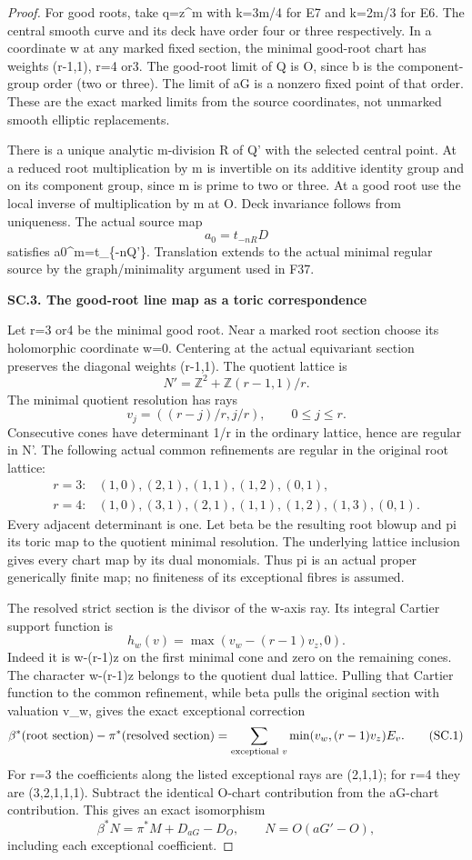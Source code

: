 \begin{proof}
For good roots, take q=z\^{}m with k=3m/4 for E7 and k=2m/3 for E6.
The central smooth curve and its deck have order four or three
respectively. In a coordinate w at any marked fixed section,
the minimal good-root chart has weights (r-1,1), r=4 or3.
The good-root limit of Q is O, since b is the component-group
order (two or three). The limit of aG is a nonzero fixed point
of that order. These are the exact marked limits from the source
coordinates, not unmarked smooth elliptic replacements.

There is a unique analytic m-division R of Q' with the selected
central point. At a reduced root multiplication by m is invertible
on its additive identity group and on its component group, since
m is prime to two or three. At a good root use the local inverse
of multiplication by m at O. Deck invariance follows from
uniqueness. The actual source map
\[
                         a_0=t_{-nR}D
\]
satisfies a0\^{}m=t\_\{-nQ'\}. Translation extends to the actual minimal
regular source by the graph/minimality argument used in F37.

\par

\medskip\noindent\textbf{SC.3. The good-root line map as a toric correspondence}

Let r=3 or4 be the minimal good root. Near a marked root section
choose its holomorphic coordinate w=0. Centering at the actual
equivariant section preserves the diagonal weights (r-1,1).
The quotient lattice is
\[
 N'=\mathbb Z^2+\mathbb Z(r-1,1)/r.
\]
The minimal quotient resolution has rays
\[
 v_j=((r-j)/r,j/r),\qquad 0\le j\le r.
\]
Consecutive cones have determinant 1/r in the ordinary lattice,
hence are regular in N'. The following actual common refinements
are regular in the original root lattice:
\[
\begin{array}{ll}
r=3:&(1,0),(2,1),(1,1),(1,2),(0,1),\\
r=4:&(1,0),(3,1),(2,1),(1,1),(1,2),(1,3),(0,1).
\end{array}
\]
Every adjacent determinant is one. Let beta be the resulting root
blowup and pi its toric map to the quotient minimal resolution.
The underlying lattice inclusion gives every chart map by its
dual monomials. Thus pi is an actual proper generically finite
map; no finiteness of its exceptional fibres is assumed.

The resolved strict section is the divisor of the w-axis ray.
Its integral Cartier support function is
\[
 h_w(v)=\max(v_w-(r-1)v_z,0).
\]
Indeed it is w-(r-1)z on the first minimal cone and zero on the
remaining cones. The character w-(r-1)z belongs to the quotient
dual lattice. Pulling that Cartier function to the common
refinement, while beta pulls the original section with valuation
v\_w, gives the exact exceptional correction
\[
 \beta^*(\hbox{root section})-\pi^*(\hbox{resolved section})
 =\sum_{\text{exceptional }v}\min(v_w,(r-1)v_z)E_v.       \tag{SC.1}
\]
For r=3 the coefficients along the listed exceptional rays are
(2,1,1); for r=4 they are (3,2,1,1,1). Subtract the identical
O-chart contribution from the aG-chart contribution. This gives
an exact isomorphism
\[
 \beta^*N=\pi^*M+D_{aG}-D_O,\qquad N=O(aG'-O),           \tag{SC.2}
\]
including each exceptional coefficient.


\end{proof}
